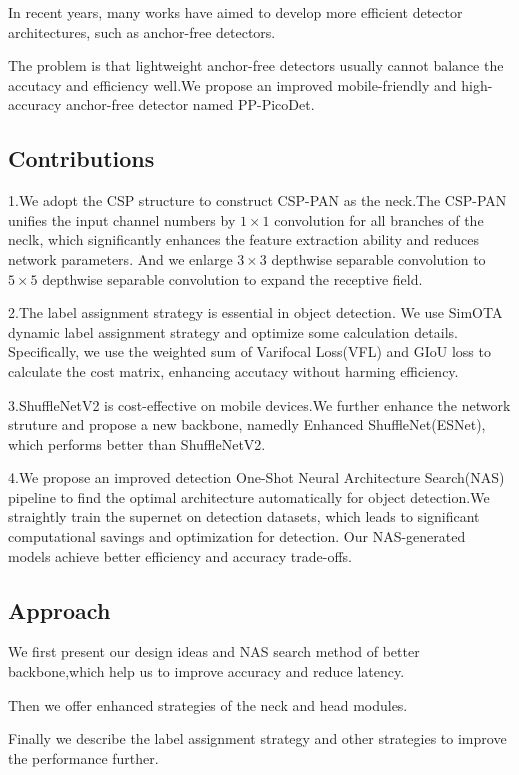 \documentclass[11pt]{article}
\begin{document}
In recent years, many works have aimed to develop more efficient detector architectures, such as anchor-free detectors.

The problem is that lightweight anchor-free detectors usually cannot balance the accutacy and efficiency well.We propose an improved mobile-friendly and high-accuracy anchor-free detector named PP-PicoDet.
\subsection{Contributions}
1.We adopt the CSP structure to construct CSP-PAN as the neck.The CSP-PAN unifies the input channel numbers by $1\times 1$ convolution for all branches of the neclk, which significantly enhances the feature extraction ability and reduces network parameters. And we enlarge $3\times 3$ depthwise separable convolution to $5\times 5$ depthwise separable convolution to expand the receptive field.

2.The label assignment strategy is essential in object detection. We use SimOTA dynamic label assignment strategy and optimize some calculation details. Specifically, we use the weighted sum of Varifocal Loss(VFL) and GIoU loss to calculate the cost matrix, enhancing accutacy without harming efficiency.

3.ShuffleNetV2 is cost-effective on mobile devices.We further enhance the network struture and propose a new backbone, namedly Enhanced ShuffleNet(ESNet), which performs better than ShuffleNetV2.

4.We propose an improved detection One-Shot Neural Architecture Search(NAS) pipeline to find the optimal architecture automatically for object detection.We straightly train the supernet on detection datasets, which leads to significant computational savings and optimization for detection. Our NAS-generated models achieve better efficiency and accuracy trade-offs.
\subsection{Approach}
We first present our design ideas and NAS search method of better backbone,which help us to improve accuracy and reduce latency.

Then we offer enhanced strategies of the neck and head modules.

Finally we describe the label assignment strategy and other strategies to improve the performance further.
\end{document}
